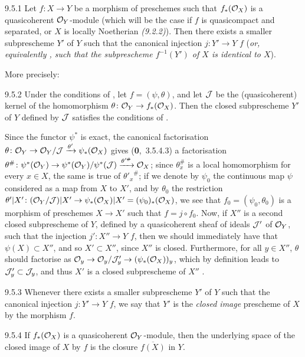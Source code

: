 
\begin{env}[Proposition]{9.5.1}
\label{prop-1.9.5.1}
Let $f\colon X\to Y$ be a morphism of preschemes
such that $f_\ast(\mathcal{O}_X)$ is a quasicoherent $\mathcal{O}_Y$-module (which will be the
case if $f$ is quasicompact {and separated, or} $X$ is locally Noetherian
\emph{(9.2.2)}). Then there exists a smaller subprescheme $Y'$ of $Y$ such that
the canonical injection $j\colon Y'\to Y$  $f$ (\emph{or, equivalently
, such that the subprescheme $f^{-1}(Y')$ of $X$ is \emph{identical}
to $X$}).
\end{env}

More precisely:

\begin{env}[Corollary]{9.5.2}
\label{cor-1.9.5.2}
Under the conditions of , let
$f=(\psi,\theta)$, and let $\mathcal{J}$ be the (quasicoherent) kernel of the
homomorphism $\theta\colon\mathcal{O}_Y\to f_\ast(\mathcal{O}_X)$. Then the closed subprescheme
$Y'$ of $Y$ defined by $\mathcal{J}$ satisfies the conditions of .
\end{env}

Since the functor $\psi^\ast$ is exact, the canonical factorisation
$\theta\colon\mathcal{O}_Y\to\mathcal{O}_Y/\mathcal{J}\xrightarrow{\theta'}\psi_\ast(\mathcal{O}_X)$ gives
(\textbf{0},~3.5.4.3) a factorisation
$\theta^\#\colon\psi^\ast(\mathcal{O}_Y)\to\psi^\ast(\mathcal{O}_Y)/\psi^\ast(\mathcal{J})
\xrightarrow{\theta'^\#}\mathcal{O}_X$;
since $\theta_x^\#$ is a local homomorphism for every $x\in X$, the same is true
of ${\theta'_x}^\#$; if we denote by $\psi_0$ the continuous map $\psi$
considered as a map from $X$ to $X'$, and by $\theta_0$ the restriction
$\theta'|X'\colon(\mathcal{O}_Y/\mathcal{J})|X'\to\psi_\ast(\mathcal{O}_X)|X'=(\psi_0)_\ast(\mathcal{O}_X)$,
we see that $f_0=(\psi_0,\theta_0)$ is a morphism of preschemes $X\to X'$
 such that $f=j\circ f_0$. Now, if $X''$ is a second
closed subprescheme of $Y$, defined by a quasicoherent sheaf of ideals
$\mathcal{J}'$ of $\mathcal{O}_Y$, such that the injection $j'\colon X''\to Y$ 
$f$, then we should immediately have that $\psi(X)\subset X''$, and so
$X'\subset X''$, since $X''$ is closed. Furthermore, for all $y\in X''$,
$\theta$ should factorise as $\mathcal{O}_y\to\mathcal{O}_y/\mathcal{J}'_y\to(\psi_\ast(\mathcal{O}_X))_y$,
which by definition leads to $\mathcal{J}'_y\subset\mathcal{J}_y$, and thus $X'$ is
a closed subprescheme of $X''$ .

\begin{envr}[Definition]{9.5.3}
\label{defn-1.9.5.3}
Whenever there exists a smaller subprescheme $Y'$
of $Y$ such that the canonical injection $j\colon Y'\to Y$  $f$, we
say that $Y'$ is the \emph{closed image} prescheme of $X$ by the morphism $f$.
\end{envr}

\begin{env}[Proposition]{9.5.4}
\label{prop-1.9.5.4}
If $f_\ast(\mathcal{O}_X)$ is a quasicoherent $\mathcal{O}_Y$-module, then the underlying space of
the closed image of $X$ by $f$ is the closure $\overline{f(X)}$ in $Y$.
\end{env}

